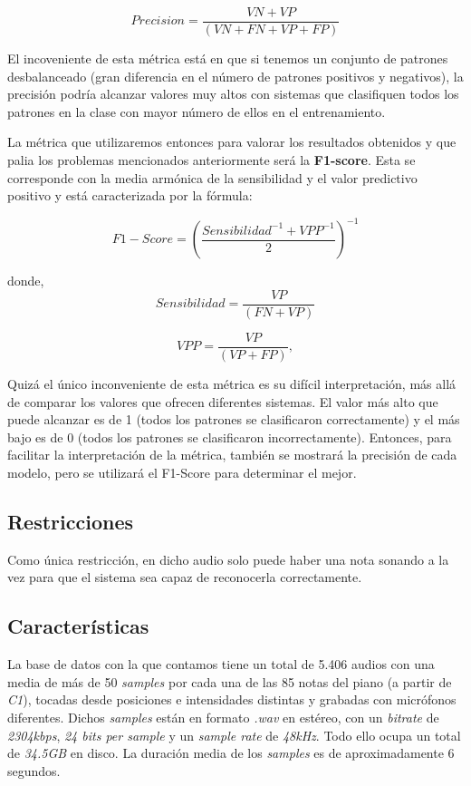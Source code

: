 \documentclass[12pt]{article}
\begin{document}
\begin{equation}
	Precision = \frac{VN + VP}{(VN + FN + VP + FP)}
\end{equation}

\smallskip
El incoveniente de esta métrica está en que si tenemos un conjunto de patrones desbalanceado (gran diferencia en el número de
patrones positivos y negativos), la precisión podría alcanzar valores muy altos con sistemas que clasifiquen todos los patrones en la clase con mayor número de ellos
en el entrenamiento.

\bigskip
La métrica que utilizaremos entonces para valorar los resultados obtenidos y que palia los problemas
mencionados anteriormente será la \textbf{F1-score}. Esta se corresponde con la media armónica de la sensibilidad y el
valor predictivo positivo y está caracterizada por la fórmula: 

\begin{equation}
	F1-Score = \left(\frac{Sensibilidad^{-1} + VPP^{-1}}{2}\right)^{-1}
\end{equation}

donde, 
\begin{equation}
	Sensibilidad = \frac{VP}{(FN + VP)}
\end{equation}

\begin{equation}
	VPP = \frac{VP}{(VP + FP)}, 
\end{equation}

\smallskip
Quizá el único inconveniente de esta métrica es su difícil interpretación, más allá de comparar los valores que ofrecen diferentes sistemas.
El valor más alto que puede alcanzar es de 1 (todos los patrones se clasificaron correctamente) y el más bajo es de 0 (todos los patrones se clasificaron
incorrectamente). Entonces, para facilitar la interpretación de la métrica, también se mostrará la precisión de cada modelo, pero se utilizará
el F1-Score para determinar el mejor.

\newpage
\subsection{Restricciones}
\bigskip
Como única restricción, en dicho audio solo puede haber una nota sonando a la vez para que el sistema sea capaz de reconocerla correctamente.

\subsection{Características}
\bigskip
La base de datos con la que contamos tiene un total de 5.406 audios con una media de más de 50 \textit{samples} por cada una de las 85 notas del piano (a partir de \textit{C1}), tocadas
desde posiciones e intensidades distintas y grabadas con micrófonos diferentes. Dichos \textit{samples} están en formato \textit{.wav} en estéreo, con un 
\textit{bitrate} de \textit{2304kbps}, \textit{24 bits per sample} y un \textit{sample rate} de \textit{48kHz}. Todo ello ocupa un total de \textit{34.5GB} en disco.
La duración media de los \textit{samples} es de aproximadamente 6 segundos.
\end{document}
